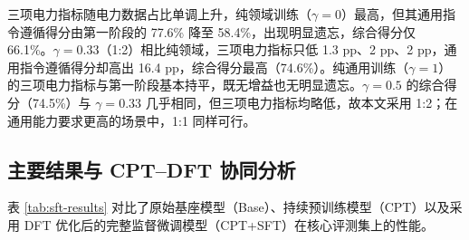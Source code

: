\documentclass[fontset=fandol,type=master,campus=shenzhen,etitleauto=true]{hithesisbook}
\begin{document}
\begin{table}[htbp]
\centering
\caption{SFT 第二阶段通用-领域数据配比实验结果}
\label{tab:sft-ratio}
\small
\setlength{\tabcolsep}{4pt}
\end{table}

三项电力指标随电力数据占比单调上升，纯领域训练（$\gamma = 0$）最高，但其通用指令遵循得分由第一阶段的 77.6\% 降至 58.4\%，出现明显遗忘，综合得分仅 66.1\%。$\gamma = 0.33$（1:2）相比纯领域，三项电力指标只低 1.3 pp、2 pp、2 pp，通用指令遵循得分却高出 16.4 pp，综合得分最高（74.6\%）。纯通用训练（$\gamma = 1$）的三项电力指标与第一阶段基本持平，既无增益也无明显遗忘。$\gamma = 0.5$ 的综合得分（74.5\%）与 $\gamma = 0.33$ 几乎相同，但三项电力指标均略低，故本文采用 1:2；在通用能力要求更高的场景中，1:1 同样可行。

\subsection{主要结果与 CPT--DFT 协同分析}\label{ux4e3bux8981ux7ed3ux679c-2}

表 \ref{tab:sft-results} 对比了原始基座模型（Base）、持续预训练模型（CPT）以及采用 DFT 优化后的完整监督微调模型（CPT+SFT）在核心评测集上的性能。
\end{document}
